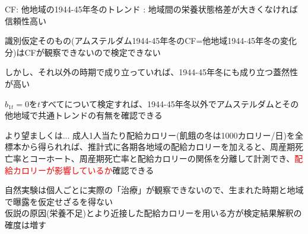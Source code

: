 \begin{frame}{}
CF: 他地域の1944-45年冬のトレンド
\pause : 地域間の栄養状態格差が大きくなければ信頼性高い
\begin{dinglist}{43}
\vspace{1.0ex}\setlength{\itemsep}{1.0ex}\setlength{\baselineskip}{12pt}
\pause
\item	識別仮定そのもの(アムステルダム1944-45年冬のCF=他地域1944-45年冬の変化分)はCFが観察できないので検定できない
\pause
\item	しかし、それ以外の時期で成り立っていれば、1944-45年冬にも成り立つ蓋然性が高い
\end{dinglist}
\pause
\vspace{2ex}
$b_{1t}=0$を$t$すべてについて検定すれば、1944-45年冬以外でアムステルダムとその他地域で共通トレンドの有無を確認できる
\pause
\begin{dinglist}{45}
\vspace{1.0ex}\setlength{\itemsep}{1.0ex}\setlength{\baselineskip}{12pt}
\item	より望ましくは...\pause
成人1人当たり配給カロリー(飢餓の冬は1000カロリー/日)を全標本から得られれば、推計式に各期各地域の配給カロリーを加えると、周産期死亡率とコーホート、周産期死亡率と配給カロリーの関係を分離して計測でき、\textcolor{red}{配給カロリーが影響しているか}確認できる
\end{dinglist}
\vspace{2ex}
\pause
自然実験は個人ごとに実際の「治療」が観察できないので、生まれた時期と地域で曝露を仮定せざるを得ない\\
\pause
\vspace{1ex}
{\footnotesize 仮説の原因(栄養不足)とより近接した配給カロリーを用いる方が検定結果解釈の確度は増す}
\end{frame}

